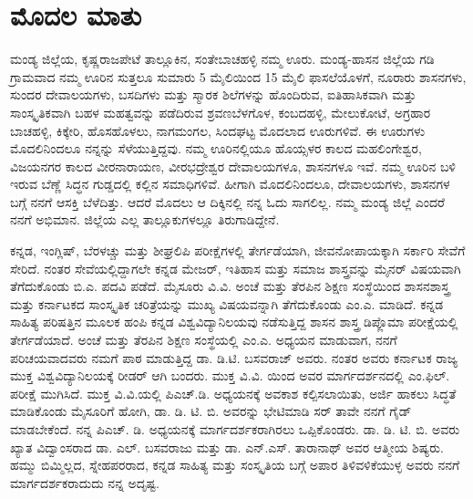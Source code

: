 \makeatletter
\renewcommand{\@makeschapterhead}[1]{%
  \vspace*{20\p@}%
  {\parindent \z@ \raggedright
    \normalfont
    \interlinepenalty\@M
    \Huge \bfseries  #1\par\nobreak
    \vskip 20\p@
  }}
\makeatother
\chapter*{}
\chapter*{ಮೊದಲ ಮಾತು}

ಮಂಡ್ಯ ಜಿಲ್ಲೆಯ, ಕೃಷ್ಣರಾಜಪೇಟೆ ತಾಲ್ಲೂಕಿನ, ಸಂತೇಬಾಚಹಳ್ಳಿ ನಮ್ಮ ಊರು.  ಮಂಡ್ಯ{\rm -}ಹಾಸನ ಜಿಲ್ಲೆಯ  ಗಡಿ ಗ್ರಾಮವಾದ ನಮ್ಮ ಊರಿನ ಸುತ್ತಲೂ ಸುಮಾರು 5 ಮೈಲಿಯಿಂದ 15 ಮೈಲಿ ಫಾಸಲೆಯೊಳಗೆ,  ನೂರಾರು ಶಾಸನಗಳು, ಸುಂದರ ದೇವಾಲಯಗಳು, ಬಸದಿಗಳು ಮತ್ತು ಸ್ಮಾರಕ ಶಿಲೆಗಳನ್ನು ಹೊಂದಿರುವ, ಐತಿಹಾಸಿಕವಾಗಿ ಮತ್ತು ಸಾಂಸ್ಕೃತಿಕವಾಗಿ ಬಹಳ ಮಹತ್ವವನ್ನು ಪಡೆದಿರುವ ಶ್ರವಣಬೆಳಗೊಳ, ಕಂಬದಹಳ್ಳಿ, ಮೇಲುಕೋಟೆ, ಅಗ್ರಹಾರ ಬಾಚಹಳ್ಳಿ, ಕಿಕ್ಕೇರಿ, ಹೊಸಹೊಳಲು, ನಾಗಮಂಗಲ, ಸಿಂದಘಟ್ಟ ಮೊದಲಾದ ಊರುಗಳಿವೆ.  ಈ ಊರುಗಳು ಮೊದಲಿನಿಂದಲೂ ನನ್ನನ್ನು ಸೆಳೆಯುತ್ತಿದ್ದವು. ನಮ್ಮ ಊರಿನಲ್ಲಿಯೂ ಹೊಯ್ಸಳರ ಕಾಲದ ಮಹಲಿಂಗೇಶ್ವರ, ವಿಜಯನಗರ ಕಾಲದ ವೀರನಾರಾಯಣ, ವೀರಭದ್ರೇಶ್ವರ ದೇವಾಲಯಗಳೂ, ಶಾಸನಗಳೂ ಇವೆ.  ನಮ್ಮ ಊರಿನ ಬಳಿ ಇರುವ ಬೆಣ್ಣೆ ಸಿದ್ಧನ ಗುಡ್ಡದಲ್ಲಿ ಕಲ್ಲಿನ ಸಮಾಧಿಗಳಿವೆ.  ಹೀಗಾಗಿ ಮೊದಲಿನಿಂದಲೂ, ದೇವಾಲಯಗಳು, ಶಾಸನಗಳ ಬಗ್ಗೆ ನನಗೆ ಆಸಕ್ತಿ ಬೆಳೆದಿತ್ತು. ಆದರೆ ಮೊದಲು ಆ ದಿಕ್ಕಿನಲ್ಲಿ ನನ್ನ ಓದು ಸಾಗಲಿಲ್ಲ. ನಮ್ಮ ಮಂಡ್ಯ ಜಿಲ್ಲೆ ಎಂದರೆ ನನಗೆ ಅಭಿಮಾನ. ಜಿಲ್ಲೆಯ ಎಲ್ಲ ತಾಲ್ಲೂಕುಗಳಲ್ಲೂ ತಿರುಗಾಡಿದ್ದೇನೆ.

ಕನ್ನಡ, ಇಂಗ್ಲಿಷ್​, ಬೆರಳಚ್ಚು ಮತ್ತು ಶೀಘ್ರಲಿಪಿ ಪರೀಕ್ಷೆಗಳಲ್ಲಿ ತೇರ್ಗಡೆಯಾಗಿ, ಜೀವನೋಪಾಯಕ್ಕಾಗಿ ಸರ್ಕಾರಿ ಸೇವೆಗೆ ಸೇರಿದೆ. ನಂತರ ಸೇವೆಯಲ್ಲಿದ್ದಾಗಲೇ ಕನ್ನಡ ಮೇಜರ್​, ಇತಿಹಾಸ ಮತ್ತು  ಸಮಾಜ ಶಾಸ್ತ್ರವನ್ನು ಮೈನರ್​ ವಿಷಯವಾಗಿ ತೆಗೆದುಕೊಂಡು ಬಿ.ಎ. ಪದವಿ ಪಡೆದೆ. ಮೈಸೂರು ವಿ.ವಿ. ಅಂಚೆ ಮತ್ತು ತೆರಪಿನ ಶಿಕ್ಷಣ ಸಂಸ್ಥೆಯಿಂದ ಶಾಸನಶಾಸ್ತ್ರ ಮತ್ತು ಕರ್ನಾಟಕದ ಸಾಂಸ್ಕೃತಿಕ ಚರಿತ್ರೆಯನ್ನು ಮುಖ್ಯ ವಿಷಯವನ್ನಾಗಿ ತೆಗೆದುಕೊಂಡು ಎಂ.ಎ. ಮಾಡಿದೆ. ಕನ್ನಡ ಸಾಹಿತ್ಯ ಪರಿಷತ್ತಿನ ಮೂಲಕ ಹಂಪಿ ಕನ್ನಡ ವಿಶ್ವವಿದ್ಯಾನಿಲಯವು ನಡೆಸುತ್ತಿದ್ದ ಶಾಸನ ಶಾಸ್ತ್ರ ಡಿಪ್ಲೊಮಾ ಪರೀಕ್ಷೆಯಲ್ಲಿ ತೇರ್ಗಡೆಯಾದೆ. ಅಂಚೆ ಮತ್ತು ತೆರಪಿನ ಶಿಕ್ಷಣ ಸಂಸ್ಥೆಯಲ್ಲಿ ಎಂ.ಎ. ಅಧ್ಯಯನ ಮಾಡುವಾಗ,  ನನಗೆ ಪರಿಚಯವಾದವರು ನಮಗೆ ಪಾಠ ಮಾಡುತ್ತಿದ್ದ ಡಾ. ಡಿ.ಟಿ. ಬಸವರಾಜ್​ ಅವರು.   ನಂತರ ಅವರು ಕರ್ನಾಟಕ ರಾಜ್ಯ ಮುಕ್ತ ವಿಶ್ವವಿದ್ಯಾನಿಲಯಕ್ಕೆ ರೀಡರ್​ ಆಗಿ ಬಂದರು. ಮುಕ್ತ ವಿ.ವಿ. ಯಿಂದ ಅವರ ಮಾರ್ಗದರ್ಶನದಲ್ಲಿ ಎಂ.ಫಿಲ್​. ಪರೀಕ್ಷೆ ಮುಗಿಸಿದೆ. ಮುಕ್ತ ವಿ.ವಿ.ಯಲ್ಲಿ ಪಿಎಚ್​.ಡಿ. ಅಧ್ಯಯನಕ್ಕೆ ಅವಕಾಶ ಕಲ್ಪಿಸಲಾಯಿತು, ಅರ್ಜಿ ಹಾಕಲು ಸಿದ್ಧತೆ ಮಾಡಿಕೊಂಡು ಮೈಸೂರಿಗೆ ಹೋಗಿ, ಡಾ. ಡಿ. ಟಿ. ಬಿ. ಅವರನ್ನು ಭೇಟಿಮಾಡಿ ಸರ್​ ತಾವೇ ನನಗೆ ಗೈಡ್​ ಮಾಡಬೇಕೆಂದೆ. ನನ್ನ ಪಿಎಚ್. ಡಿ. ಅಧ್ಯಯನಕ್ಕೆ  ಮಾರ್ಗದರ್ಶಕರಾಗಿರಲು ಒಪ್ಪಿಕೊಂಡರು. ಡಾ. ಡಿ. ಟಿ. ಬಿ. ಅವರು ಖ್ಯಾತ ವಿದ್ವಾಂಸರಾದ ಡಾ. ಎಲ್​. ಬಸವರಾಜು ಮತ್ತು ಡಾ. ಎನ್​.ಎಸ್​. ತಾರಾನಾಥ್​ ಅವರ ಆತ್ಮೀಯ ಶಿಷ್ಯರು. ಹಮ್ಮು ಬಿಮ್ಮಿಲ್ಲದ, ಸ್ನೇಹಪರರಾದ, ಕನ್ನಡ ಸಾಹಿತ್ಯ ಮತ್ತು ಸಂಸ್ಕೃತಿಯ ಬಗ್ಗೆ ಅಪಾರ ತಿಳಿವಳಿಕೆಯುಳ್ಳ ಅವರು ನನಗೆ ಮಾರ್ಗದರ್ಶಕರಾದುದು ನನ್ನ ಅದೃಷ್ಟ.

